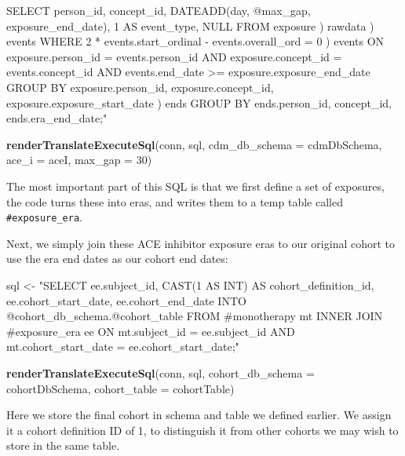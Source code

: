 \documentclass[11pt]{book}
\newenvironment{Shaded}{\begin{snugshade}}{\end{snugshade}}
\newcommand{\DataTypeTok}[1]{\textcolor[rgb]{0.13,0.29,0.53}{#1}}
\newcommand{\DecValTok}[1]{\textcolor[rgb]{0.00,0.00,0.81}{#1}}
\newcommand{\KeywordTok}[1]{\textcolor[rgb]{0.13,0.29,0.53}{\textbf{#1}}}
\newcommand{\NormalTok}[1]{#1}
\newcommand{\StringTok}[1]{\textcolor[rgb]{0.31,0.60,0.02}{#1}}
\theoremstyle{definition}
\theoremstyle{definition}
\theoremstyle{definition}
\theoremstyle{remark}
\begin{document}
\begin{Shaded}
\begin{Highlighting}[]
\StringTok{        SELECT person_id,}
\StringTok{          concept_id,}
\StringTok{          DATEADD(day, @max_gap, exposure_end_date),}
\StringTok{          1 AS event_type,}
\StringTok{          NULL}
\StringTok{        FROM exposure}
\StringTok{        ) rawdata}
\StringTok{    ) events}
\StringTok{  WHERE 2 * events.start_ordinal - events.overall_ord = 0}
\StringTok{  ) events}
\StringTok{  ON exposure.person_id = events.person_id}
\StringTok{      AND exposure.concept_id = events.concept_id}
\StringTok{      AND events.end_date >= exposure.exposure_end_date}
\StringTok{  GROUP BY exposure.person_id,}
\StringTok{      exposure.concept_id,}
\StringTok{      exposure.exposure_start_date}
\StringTok{  ) ends}
\StringTok{GROUP BY ends.person_id,}
\StringTok{  concept_id,}
\StringTok{  ends.era_end_date;"}

\KeywordTok{renderTranslateExecuteSql}\NormalTok{(conn, sql, }\DataTypeTok{cdm_db_schema =}\NormalTok{ cdmDbSchema, }\DataTypeTok{ace_i =}\NormalTok{ aceI, }\DataTypeTok{max_gap =} \DecValTok{30}\NormalTok{)}
\end{Highlighting}
\end{Shaded}

The most important part of this SQL is that we first define a set of exposures, the code turns these into eras, and writes them to a temp table called \texttt{\#exposure\_era}.

Next, we simply join these ACE inhibitor exposure eras to our original cohort to use the era end dates as our cohort end dates:

\begin{Shaded}
\begin{Highlighting}[]
\NormalTok{sql <-}\StringTok{ "SELECT ee.subject_id,}
\StringTok{  CAST(1 AS INT) AS cohort_definition_id,}
\StringTok{  ee.cohort_start_date,}
\StringTok{  ee.cohort_end_date}
\StringTok{INTO @cohort_db_schema.@cohort_table}
\StringTok{FROM #monotherapy mt}
\StringTok{INNER JOIN #exposure_era ee}
\StringTok{  ON mt.subject_id = ee.subject_id}
\StringTok{    AND mt.cohort_start_date = ee.cohort_start_date;"}

\KeywordTok{renderTranslateExecuteSql}\NormalTok{(conn, sql, }\DataTypeTok{cohort_db_schema =}\NormalTok{ cohortDbSchema, }\DataTypeTok{cohort_table =}\NormalTok{ cohortTable)}
\end{Highlighting}
\end{Shaded}

Here we store the final cohort in schema and table we defined earlier. We assign it a cohort definition ID of 1, to distinguish it from other cohorts we may wish to store in the same table.
\end{document}
